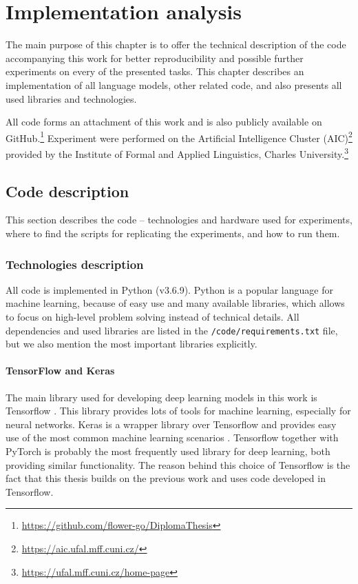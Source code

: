 \chapter{Implementation analysis}
\label{chap:impl}
The main purpose of this chapter is to offer the technical description of the code accompanying this work for better reproducibility and possible further experiments on every of the presented tasks. This chapter describes an implementation of all language models, other related code, and also presents all used libraries and technologies.
\par
All code forms an attachment of this work and is also publicly available on GitHub.\footnote{\url{https://github.com/flower-go/DiplomaThesis}} Experiment were performed on the Artificial Intelligence Cluster (AIC)\footnote{\url{https://aic.ufal.mff.cuni.cz/}} provided by the Institute of Formal and Applied Linguistics, Charles University.\footnote{\url{https://ufal.mff.cuni.cz/home-page}}

\section{Code description}
This section describes the code -- technologies and hardware used for experiments, where to find the scripts for replicating the experiments, and how to run them.
\subsection{Technologies description}
All code is implemented in Python (v3.6.9). Python is a popular language for machine learning, because of easy use and many available libraries, which allows to focus on high-level problem solving instead of technical details. All dependencies and used libraries are listed in the \texttt{/code/requirements.txt} file, but we also mention the most important libraries explicitly.
\subsubsection{TensorFlow and Keras}
The main library used for developing deep learning models in this work is Tensorflow \citep{tensorflow2015-whitepaper}. This library provides lots of tools for machine learning, especially for neural networks. Keras is a wrapper library over Tensorflow and provides easy use of the most common machine learning scenarios \citep{keras}. Tensorflow together with PyTorch \citep{NEURIPS2019_9015} is probably the most frequently used library for deep learning, both providing similar functionality. The reason behind this choice of Tensorflow is the fact that this thesis builds on the previous work and uses code developed in Tensorflow.
